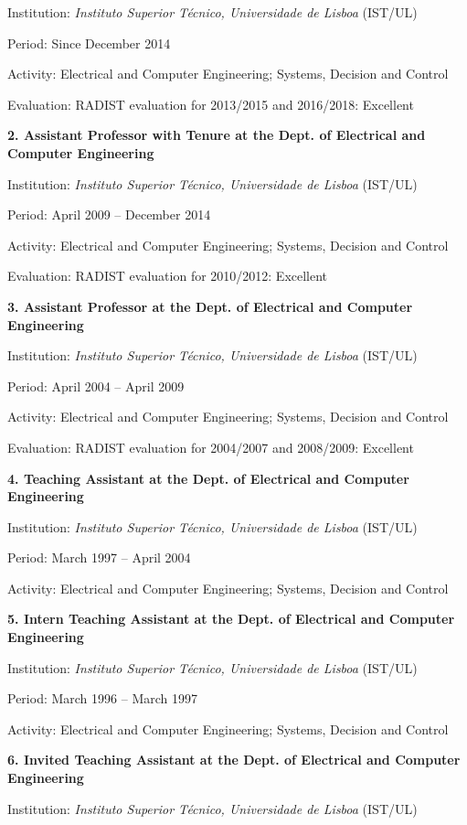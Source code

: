 \documentclass[
]{article}
\begin{document}
Institution: \emph{Instituto Superior Técnico, Universidade de Lisboa}
(IST/UL)

Period: Since December 2014

Activity: Electrical and Computer Engineering; Systems, Decision and
Control

Evaluation: RADIST evaluation for 2013/2015 and 2016/2018: Excellent

\textbf{2. Assistant Professor with Tenure at the Dept. of Electrical
and Computer Engineering}

Institution: \emph{Instituto Superior Técnico, Universidade de Lisboa}
(IST/UL)

Period: April 2009 -- December 2014

Activity: Electrical and Computer Engineering; Systems, Decision and
Control

Evaluation: RADIST evaluation for 2010/2012: Excellent

\textbf{3. Assistant Professor at the Dept. of Electrical and Computer
Engineering}

Institution: \emph{Instituto Superior Técnico, Universidade de Lisboa}
(IST/UL)

Period: April 2004 -- April 2009

Activity: Electrical and Computer Engineering; Systems, Decision and
Control

Evaluation: RADIST evaluation for 2004/2007 and 2008/2009: Excellent

\textbf{4. Teaching Assistant at the Dept. of Electrical and Computer
Engineering}

Institution: \emph{Instituto Superior Técnico, Universidade de Lisboa}
(IST/UL)

Period: March 1997 -- April 2004

Activity: Electrical and Computer Engineering; Systems, Decision and
Control

\textbf{5. Intern Teaching Assistant at the Dept. of Electrical and
Computer Engineering}

Institution: \emph{Instituto Superior Técnico, Universidade de Lisboa}
(IST/UL)

Period: March 1996 -- March 1997

Activity: Electrical and Computer Engineering; Systems, Decision and
Control

\textbf{6. Invited Teaching Assistant at the Dept. of Electrical and
Computer Engineering}

Institution: \emph{Instituto Superior Técnico, Universidade de Lisboa}
(IST/UL)
\end{document}
